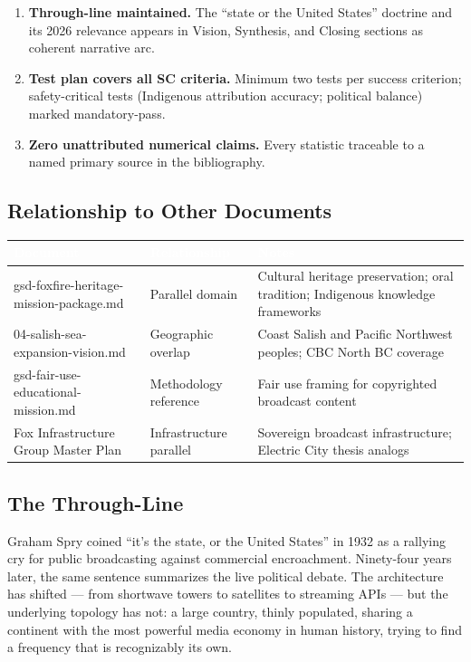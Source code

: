 \documentclass[11pt,letterpaper]{article}
\newcommand{\tableheader}[1]{\textbf{\sffamily\textcolor{white}{#1}}}
\begin{document}
\begin{enumerate}[leftmargin=*, label=\textbf{SC-\arabic*.}]
\item \textbf{Through-line maintained.} The ``state or the United States'' doctrine and its 2026 relevance appears in Vision, Synthesis, and Closing sections as coherent narrative arc.
\item \textbf{Test plan covers all SC criteria.} Minimum two tests per success criterion; safety-critical tests (Indigenous attribution accuracy; political balance) marked mandatory-pass.
\item \textbf{Zero unattributed numerical claims.} Every statistic traceable to a named primary source in the bibliography.
\end{enumerate}

\subsection{Relationship to Other Documents}

\begin{center}
\begin{tabularx}{\textwidth}{L{3.5cm}L{3cm}X}
\toprule
{}
\tableheader{Document} & \tableheader{Relationship} & \tableheader{Notes} \\
\midrule
gsd-foxfire-heritage-mission-package.md & Parallel domain & Cultural heritage preservation; oral tradition; Indigenous knowledge frameworks \\
04-salish-sea-expansion-vision.md & Geographic overlap & Coast Salish and Pacific Northwest peoples; CBC North BC coverage \\
gsd-fair-use-educational-mission.md & Methodology reference & Fair use framing for copyrighted broadcast content \\
Fox Infrastructure Group Master Plan & Infrastructure parallel & Sovereign broadcast infrastructure; Electric City thesis analogs \\
\bottomrule
\end{tabularx}
\end{center}

\subsection{The Through-Line}

Graham Spry coined ``it's the state, or the United States'' in 1932 as a rallying cry for public broadcasting against commercial encroachment. Ninety-four years later, the same sentence summarizes the live political debate. The architecture has shifted --- from shortwave towers to satellites to streaming APIs --- but the underlying topology has not: a large country, thinly populated, sharing a continent with the most powerful media economy in human history, trying to find a frequency that is recognizably its own.
\end{document}
